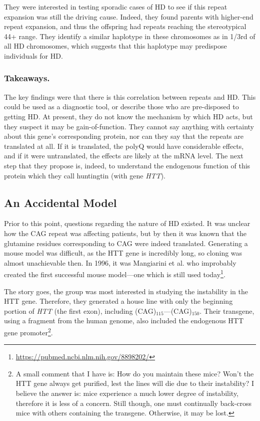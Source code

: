They were interested in testing sporadic cases of HD to see if this repeat expansion was still the driving cause. Indeed, they found parents with higher-end repeat expansion, and thus the offspring had repeats reaching the stereotypical 44+ range. They identify a similar haplotype in these chromosomes as in 1/3rd of all HD chromosomes, which suggests that this haplotype may predispose individuals for HD. 

\subsubsection*{Takeaways.}

The key findings were that there is this correlation between repeats and HD. This could be used as a diagnostic tool, or describe those who are pre-disposed to getting HD. At present, they do not know the mechanism by which HD acts, but they suspect it may be gain-of-function. They cannot say anything with certainty about this gene's corresponding protein, nor can they say that the repeats are translated at all. If it is translated, the polyQ would have considerable effects, and if it were untranslated, the effects are likely at the mRNA level. The next step that they propose is, indeed, to understand the endogenous function of this protein which they call huntingtin (with gene \textit{HTT}). 


\subsection*{An Accidental Model}

Prior to this point, questions regarding the nature of HD existed. It was unclear how the CAG repeat was affecting patients, but by then it was known that the glutamine residues corresponding to CAG were indeed translated. Generating a mouse model was difficult, as the HTT gene is incredibly long, so cloning was almost unachievable then. In 1996, it was Mangiarini et al. who improbably created the first successful mouse model---one which is still used today\footnote{\url{https://pubmed.ncbi.nlm.nih.gov/8898202/}}.\newline

The story goes, the group was most interested in studying the instability in the HTT gene. Therefore, they generated a house line with only the beginning portion of \textit{HTT} (the first exon), including (CAG)$_{115}$---(CAG)$_{150}$. Their transgene, using a fragment from the human genome, also included the endogenous HTT gene promoter\footnote{A small comment that I have is: How do you maintain these mice? Won't the HTT gene always get purified, lest the lines will die due to their instability? I believe the answer is: mice experience a much lower degree of instability, therefore it is less of a concern. Still though, one must continually back-cross mice with others containing the transgene. Otherwise, it may be lost.}.\newline

